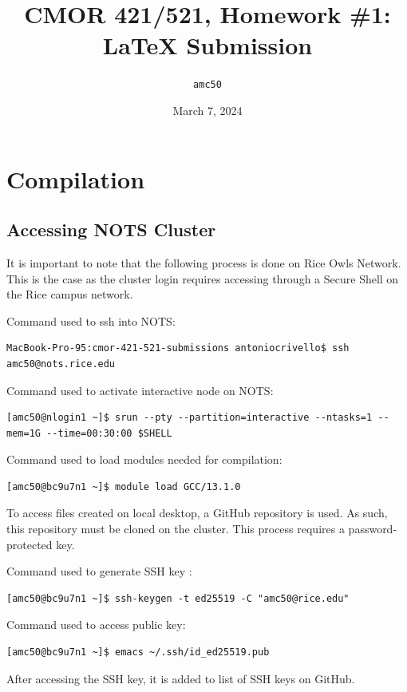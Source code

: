 \documentclass{article}
\title{CMOR 421/521, Homework \#1: \LaTeX{} Submission}
\author{\texttt{amc50}}
\date{March 7, 2024}
\begin{document}
\maketitle

\section{Compilation}

\subsection{Accessing NOTS Cluster}
It is important to note that the following process is done on Rice Owls Network. This is the case as the cluster login requires accessing through a Secure Shell on the Rice campus network.

\bigskip
\noindent Command used to ssh into NOTS:

\begin{verbatim}
MacBook-Pro-95:cmor-421-521-submissions antoniocrivello$ ssh amc50@nots.rice.edu
\end{verbatim}

\bigskip
\noindent Command used to activate interactive node on NOTS:
\begin{verbatim}
[amc50@nlogin1 ~]$ srun --pty --partition=interactive --ntasks=1 --mem=1G --time=00:30:00 $SHELL
\end{verbatim}

\bigskip
\noindent Command used to load modules needed for compilation:
\begin{verbatim}
[amc50@bc9u7n1 ~]$ module load GCC/13.1.0 
\end{verbatim}

\bigskip
\noindent To access files created on local desktop, a GitHub repository is used. As such, this repository must be cloned on the cluster. This process requires a password-protected key.

\bigskip
\noindent Command used to generate SSH key :
\begin{verbatim}
[amc50@bc9u7n1 ~]$ ssh-keygen -t ed25519 -C "amc50@rice.edu"
\end{verbatim}

\bigskip
\noindent Command used to access public key:
\begin{verbatim}
[amc50@bc9u7n1 ~]$ emacs ~/.ssh/id_ed25519.pub 
\end{verbatim}

\bigskip
\noindent After accessing the SSH key, it is added to list of SSH keys on GitHub.
\end{document}
